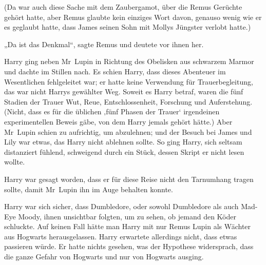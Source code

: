 (Da war auch diese Sache mit dem Zaubergamot, über die Remus Gerüchte gehört hatte, aber Remus glaubte kein einziges Wort davon, genauso wenig wie er es geglaubt hatte, dass James seinen Sohn mit Mollys Jüngster verlobt hatte.)

„Da ist das Denkmal“, sagte Remus und deutete vor ihnen her.

\later

Harry ging neben Mr~Lupin in Richtung des Obelisken aus schwarzem Marmor und dachte im Stillen nach. Es schien Harry, dass dieses Abenteuer im Wesentlichen fehlgeleitet war; er hatte keine Verwendung für Trauerbegleitung, das war nicht Harrys gewählter Weg. Soweit es Harry betraf, waren die fünf Stadien der Trauer Wut, Reue, Entschlossenheit, Forschung und Auferstehung. (Nicht, dass es für die üblichen ‚fünf Phasen der Trauer‘ irgendeinen experimentellen Beweis gäbe, von dem Harry jemals gehört hätte.) Aber Mr~Lupin schien zu aufrichtig, um abzulehnen; und der Besuch bei James und Lily war etwas, das Harry nicht ablehnen sollte. So ging Harry, sich seltsam distanziert fühlend, schweigend durch ein Stück, dessen Skript er nicht lesen wollte.

Harry war gesagt worden, dass er für diese Reise nicht den Tarnumhang tragen sollte, damit Mr~Lupin ihn im Auge behalten konnte.

Harry war sich sicher, dass Dumbledore, oder sowohl Dumbledore als auch Mad-Eye Moody, ihnen unsichtbar folgten, um zu sehen, ob jemand den Köder schluckte. Auf keinen Fall hätte man Harry mit nur Remus Lupin als Wächter aus Hogwarts herausgelassen. Harry erwartete allerdings nicht, dass etwas passieren würde. Er hatte nichts gesehen, was der Hypothese widersprach, dass die ganze Gefahr von Hogwarts und nur von Hogwarts ausging.

